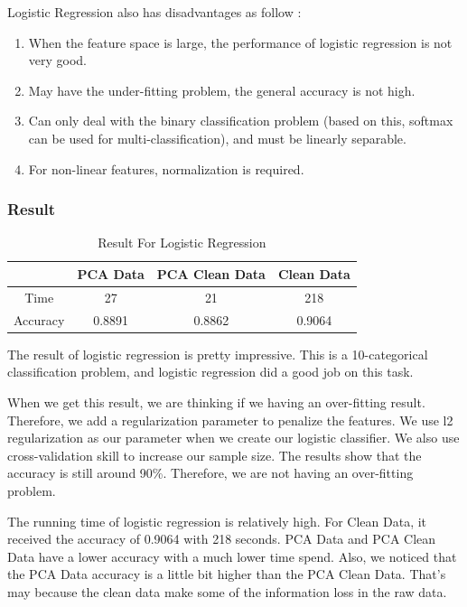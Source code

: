 \documentclass[sigconf]{acmart}
\begin{document}
Logistic Regression also has disadvantages as follow \cite{LR}:
\begin{enumerate}
    \item When the feature space is large, the performance of logistic regression is not very good.
    \item May have the under-fitting problem, the general accuracy is not high.
    \item Can only deal with the binary classification problem (based on this, softmax can be used for multi-classification), and must be linearly separable.
    \item For non-linear features, normalization is required.
\end{enumerate}

\subsubsection{Result}

\begin{table}[htb]
    \centering
    \begin{tabular}{|c|c|c|c|} \hline
                 &  PCA Data & PCA Clean Data & Clean Data \\ \hline
        Time     &  27       & 21              & 218       \\
        Accuracy &  0.8891   & 0.8862          & 0.9064    \\ \hline
    \end{tabular}
    \caption{Result For Logistic Regression}
\end{table}

The result of logistic regression is pretty impressive. This is a 10-categorical classification problem, and logistic regression did a good job on this task.

When we get this result, we are thinking if we having an over-fitting result. Therefore, we add a regularization parameter to penalize the features. We use l2 regularization as our parameter when we create our logistic classifier. We also use cross-validation skill to increase our sample size. The results show that the accuracy is still around 90\%. Therefore, we are not having an over-fitting problem.

The running time of logistic regression is relatively high. For Clean Data, it received the accuracy of 0.9064 with 218 seconds. PCA Data and PCA Clean Data have a lower accuracy with a much lower time spend. Also, we noticed that the PCA Data accuracy is a little bit higher than the PCA Clean Data. That's may because the clean data make some of the information loss in the raw data.
\end{document}
